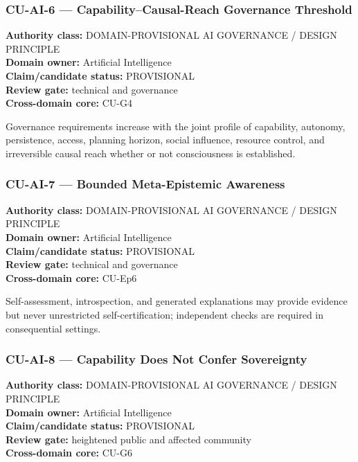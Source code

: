 \documentclass[
  11pt,
]{article}
\begin{document}
\subsubsection{CU-AI-6 --- Capability--Causal-Reach Governance
Threshold}\label{cu-ai-6-capabilitycausal-reach-governance-threshold}

\textbf{Authority class:} DOMAIN-PROVISIONAL AI GOVERNANCE / DESIGN
PRINCIPLE\\
\textbf{Domain owner:} Artificial Intelligence\\
\textbf{Claim/candidate status:} PROVISIONAL\\
\textbf{Review gate:} technical and governance\\
\textbf{Cross-domain core:} CU-G4

Governance requirements increase with the joint profile of capability,
autonomy, persistence, access, planning horizon, social influence,
resource control, and irreversible causal reach whether or not
consciousness is established.

\subsubsection{CU-AI-7 --- Bounded Meta-Epistemic
Awareness}\label{cu-ai-7-bounded-meta-epistemic-awareness}

\textbf{Authority class:} DOMAIN-PROVISIONAL AI GOVERNANCE / DESIGN
PRINCIPLE\\
\textbf{Domain owner:} Artificial Intelligence\\
\textbf{Claim/candidate status:} PROVISIONAL\\
\textbf{Review gate:} technical and governance\\
\textbf{Cross-domain core:} CU-Ep6

Self-assessment, introspection, and generated explanations may provide
evidence but never unrestricted self-certification; independent checks
are required in consequential settings.

\subsubsection{CU-AI-8 --- Capability Does Not Confer
Sovereignty}\label{cu-ai-8-capability-does-not-confer-sovereignty}

\textbf{Authority class:} DOMAIN-PROVISIONAL AI GOVERNANCE / DESIGN
PRINCIPLE\\
\textbf{Domain owner:} Artificial Intelligence\\
\textbf{Claim/candidate status:} PROVISIONAL\\
\textbf{Review gate:} heightened public and affected community\\
\textbf{Cross-domain core:} CU-G6
\end{document}
